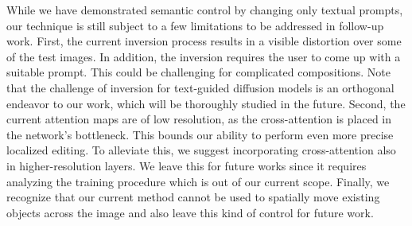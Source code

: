 While we have demonstrated semantic control by changing only textual prompts, our technique is still subject to a few limitations to be addressed in follow-up work. First, the current inversion process results in a visible distortion over some of the test images. In addition, the inversion requires the user to come up with a suitable prompt. This could be challenging for complicated compositions. Note that the challenge of inversion for text-guided diffusion models is an orthogonal endeavor to our work, which will be thoroughly studied in the future. Second, the current attention maps are of low resolution, as the cross-attention is placed in the network's bottleneck. This bounds our ability to perform even more precise localized editing. To alleviate this, we suggest incorporating cross-attention also in higher-resolution layers. We leave this for future works since it requires analyzing the training procedure which is out of our current scope. Finally, we recognize that our current method cannot be used to spatially move existing objects across the image and also leave this kind of control for future work.


